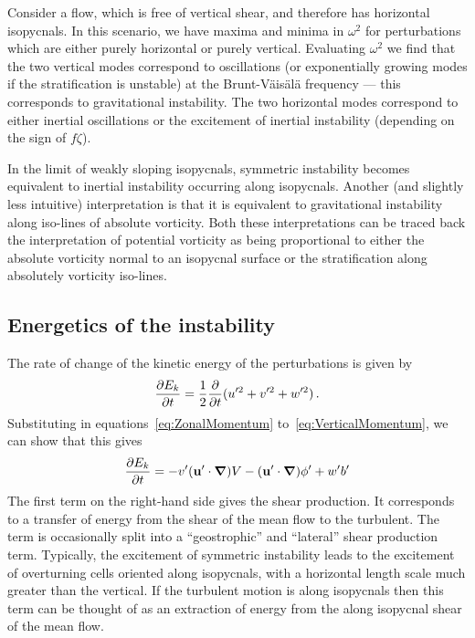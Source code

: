     Consider a flow, which is free of vertical shear, and therefore has horizontal isopycnals. In this scenario, we have maxima and minima in $\omega^2$ for perturbations which are either purely horizontal or purely vertical. Evaluating $\omega^2$ we find that the two vertical modes correspond to oscillations (or exponentially growing modes if the stratification is unstable) at the Brunt-V\"ais\"al\"a frequency --- this corresponds to gravitational instability. The two horizontal modes correspond to either inertial oscillations or the excitement of inertial instability (depending on the sign of $f \zeta$).

    In the limit of weakly sloping isopycnals, symmetric instability becomes equivalent to inertial instability occurring along isopycnals. Another (and slightly less intuitive) interpretation is that it is equivalent to gravitational instability along iso-lines of absolute vorticity. Both these interpretations can be traced back the interpretation of potential vorticity as being proportional to either the absolute vorticity normal to an isopycnal surface or the stratification along absolutely vorticity iso-lines.
    
    \subsection{Energetics of the instability}
    The rate of change of the kinetic energy of the perturbations is given by
    \begin{equation}
        \label{eq:TurbulentKE}
        \pdv{E_k}{t} = \frac{1}{2}\frac{\partial}{\partial t} (u'^2 + v'^2 + w'^2) \, .
    \end{equation}
    Substituting in equations~\ref{eq:ZonalMomentum} to~\ref{eq:VerticalMomentum}, we can show that this gives
    \begin{equation}
        \pdv{E_k}{t} = - v' (\mathbf{u}'\cdot \grad) V - (\mathbf{u}'\cdot \grad) \phi ' + w' b' 
    \end{equation}
    The first term on the right-hand side gives the shear production. It corresponds to a transfer of energy from the shear of the mean flow to the turbulent. The term is occasionally split into a ``geostrophic'' and ``lateral'' shear production term. Typically, the excitement of symmetric instability leads to the excitement of overturning cells oriented along isopycnals, with a horizontal length scale much greater than the vertical. If the turbulent motion is along isopycnals then this term can be thought of as an extraction of energy from the along isopycnal shear of the mean flow.
    
